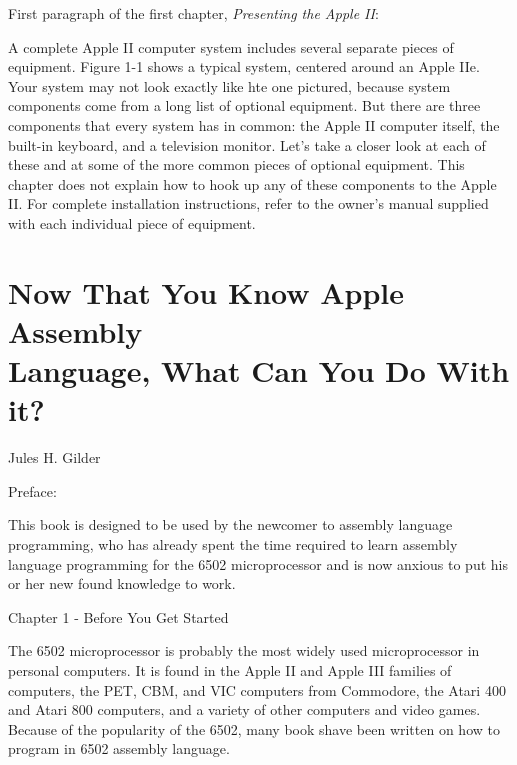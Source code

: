 \documentclass[a4paper,12pt]{article}
\begin{document}
\begin{flushleft}
First paragraph of the first chapter, \textit{Presenting the Apple II}:
\end{flushleft}

\linebreak
\begin{displayquote}
A complete Apple II computer system includes several separate pieces of equipment. Figure 1-1 shows a typical system, centered around an Apple IIe. Your system may not look exactly like hte one pictured, because system components come from a long list of optional equipment. But there are three components that every system has in common: the Apple II computer itself, the built-in keyboard, and a television monitor. Let's take a closer look at each of these and at some of the more common pieces of optional equipment. This chapter does not explain how to hook up any of these components to the Apple II. For complete installation instructions, refer to the owner's manual supplied with each individual piece of equipment.
\end{displayquote}

\section{Now That You Know Apple Assembly \\ Language, What Can You Do With it?}

\begin{flushleft}
Jules H. Gilder
\end{flushleft}

\begin{flushleft}
Preface:
\end{flushleft}
\begin{displayquote}
This book is designed to be used by the newcomer to assembly language programming, who has already spent the time required to learn assembly language programming for the 6502 microprocessor and is now anxious to put his or her new found knowledge to work.
\end{displayquote}

\begin{flushleft}
Chapter 1 - Before You Get Started
\end{flushleft}

\begin{displayquote}
The 6502 microprocessor is probably the most widely used microprocessor in personal computers. It is found in the Apple II and Apple III families of computers, the PET, CBM, and VIC computers from Commodore, the Atari 400 and Atari 800 computers, and a variety of other computers and video games. Because of the popularity of the 6502, many book shave been written on how to program in 6502 assembly language.
\end{displayquote}
\end{document}
